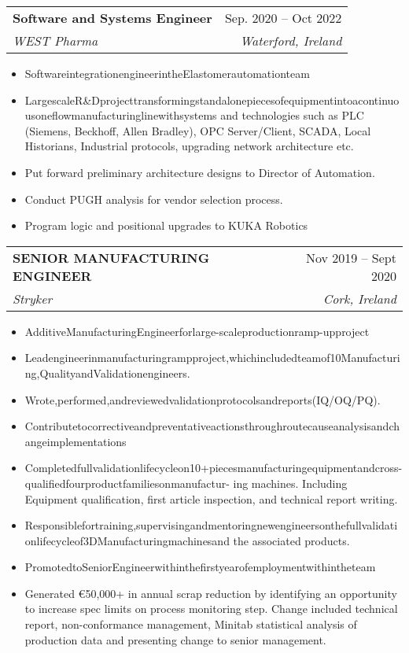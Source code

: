 \documentclass[letterpaper,11pt]{article}
\makeatletter
\newcommand{\resumeItem}[1]{
  \item\small{
    {#1 \vspace{-2pt}}
  }
}
\newcommand{\resumeSubheading}[4]{
  \vspace{-2pt}\item
    \begin{tabular*}{0.97\textwidth}[t]{l@{\extracolsep{\fill}}r}
      \textbf{#1} & #2 \\
      \textit{\small#3} & \textit{\small #4} \\
    \end{tabular*}\vspace{-7pt}
}
\newcommand{\resumeSubSubheading}[2]{
    \item
    \begin{tabular*}{0.97\textwidth}{l@{\extracolsep{\fill}}r}
      \textit{\small#1} & \textit{\small #2} \\
    \end{tabular*}\vspace{-7pt}
}
\newcommand{\resumeSubHeadingListEnd}{\end{itemize}}
\newcommand{\resumeItemListStart}{\begin{itemize}}
\newcommand{\resumeItemListEnd}{\end{itemize}\vspace{-5pt}}
\makeatother
\begin{document}

    \resumeSubheading
      {Software and Systems Engineer}{Sep. 2020 -- Oct 2022}
      {WEST Pharma}{Waterford, Ireland}
      \resumeItemListStart
        \resumeItem{SoftwareintegrationengineerintheElastomerautomationteam}
        \resumeItem{LargescaleR&Dprojecttransformingstandalonepiecesofequipmentintoacontinuousoneflowmanufacturinglinewithsystems
              and technologies such as PLC (Siemens, Beckhoff, Allen Bradley), OPC Server/Client, SCADA, Local Historians, Industrial protocols,
              upgrading network architecture etc.}
        \resumeItem{Put forward preliminary architecture designs to Director of Automation.}
         \resumeItem{ Conduct PUGH analysis for vendor selection process.}
          \resumeItem{Program logic and positional upgrades to KUKA Robotics}
    \resumeItemListEnd

    \resumeSubheading
      {SENIOR MANUFACTURING ENGINEER}{Nov 2019 -- Sept 2020}
      {Stryker}{Cork, Ireland}
      \resumeItemListStart
        \resumeItem{ AdditiveManufacturingEngineerforlarge-scaleproductionramp-upproject}
        \resumeItem{Leadengineerinmanufacturingrampproject,whichincludedteamof10Manufacturing,QualityandValidationengineers.}
        \resumeItem{Wrote,performed,andreviewedvalidationprotocolsandreports(IQ/OQ/PQ).}
        \resumeItem{Contributetocorrectiveandpreventativeactionsthroughroutecauseanalysisandchangeimplementations}
        \resumeItem{Completedfullvalidationlifecycleon10+piecesmanufacturingequipmentandcross-qualifiedfourproductfamiliesonmanufactur-
          ing machines. Including Equipment qualification, first article inspection, and technical report writing.}
        \resumeItem{Responsiblefortraining,supervisingandmentoringnewengineersonthefullvalidationlifecycleof3DManufacturingmachinesand
          the associated products.}
        \resumeItem{PromotedtoSeniorEngineerwithinthefirstyearofemploymentwithintheteam}
        \resumeItem{Generated €50,000+ in annual scrap reduction by identifying an opportunity to increase spec limits on process monitoring step.
        Change included technical report, non-conformance management, Minitab statistical analysis of production data and presenting change to senior management.}
  \resumeSubHeadingListEnd
\end{document}

